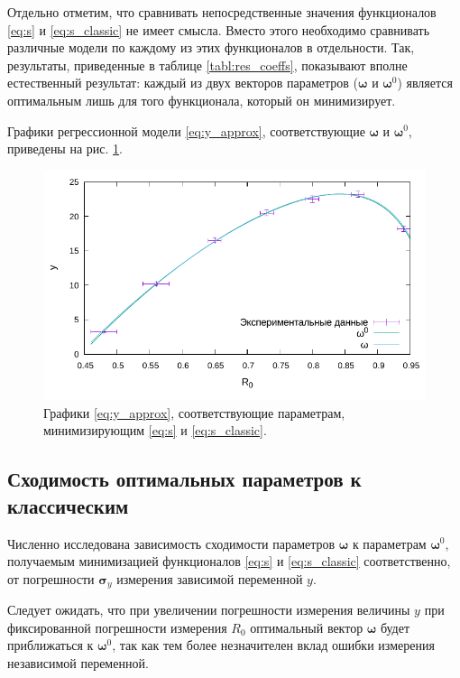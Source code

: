 \documentclass[tikz,10pt,a4paper]{article}
\newcommand{\bomega}{\boldsymbol{\omega}}
\begin{document}
Отдельно отметим, что сравнивать непосредственные значения функционалов \eqref{eq:s} и
\eqref{eq:s_classic} не имеет смысла. Вместо этого необходимо сравнивать различные
модели по каждому из этих функционалов в отдельности. Так, результаты, приведенные
в таблице \ref{tabl:res_coeffs}, показывают вполне естественный результат: каждый
из двух векторов параметров ($\bomega$ и $\bomega^0$) является оптимальным лишь
для того функционала, который он минимизирует.

Графики регрессионной модели \eqref{eq:y_approx}, соответствующие $\bomega$ и $\bomega^0$, приведены
на рис. \ref{fig:results}.

\begin{figure}[h]
  \centering
  \includegraphics[width=\textwidth]{figs/levmar/results.pdf}
  \caption{Графики \eqref{eq:y_approx}, соответствующие параметрам,
	минимизирующим \eqref{eq:s} и \eqref{eq:s_classic}.}
  \label{fig:results}
\end{figure}

\subsection{Сходимость оптимальных параметров к классическим}
Численно исследована зависимость сходимости параметров $\bomega$ к параметрам $\bomega^0$,
получаемым минимизацией функционалов \eqref{eq:s} и \eqref{eq:s_classic} соответственно, от
погрешности $\mathbf{\sigma}_y$ измерения зависимой переменной $y$.

Следует ожидать, что при увеличении погрешности измерения величины $y$ при
фиксированной погрешности измерения $R_0$ оптимальный вектор $\bomega$
будет приближаться к $\bomega^0$, так как тем более незначителен
вклад ошибки измерения независимой переменной.
\end{document}
